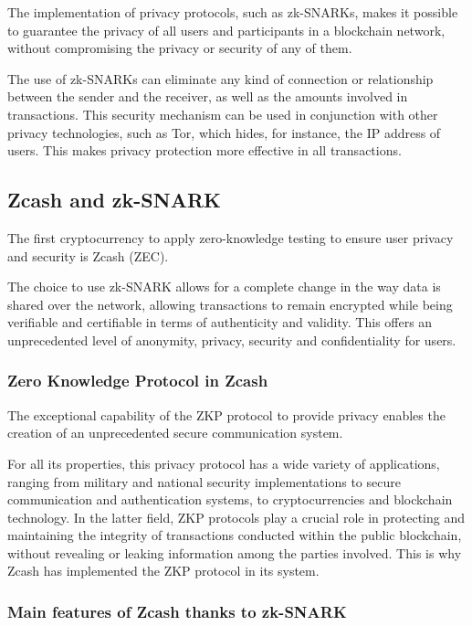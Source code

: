 \noindent The implementation of privacy protocols, such as zk-SNARKs, makes it possible to guarantee the privacy of all users and participants in a blockchain network, without compromising the privacy or security of any of them. 

\noindent The use of zk-SNARKs can eliminate any kind of connection or relationship between the sender and the receiver, as well as the amounts involved in transactions. This security mechanism can be used in conjunction with other privacy technologies, such as Tor, which hides, for instance, the IP address of users. This makes privacy protection more effective in all transactions.

\subsection{Zcash and zk-SNARK}

\noindent The first cryptocurrency to apply zero-knowledge testing to ensure user privacy and security is Zcash (ZEC).

\noindent The choice to use zk-SNARK allows for a complete change in the way data is shared over the network, allowing transactions to remain encrypted while being verifiable and certifiable in terms of authenticity and validity. This offers an unprecedented level of anonymity, privacy, security and confidentiality for users.

\subsubsection{Zero Knowledge Protocol in Zcash}

The exceptional capability of the ZKP protocol to provide privacy enables the creation of an unprecedented secure communication system.

\noindent For all its properties, this privacy protocol has a wide variety of applications, ranging from military and national security implementations to secure communication and authentication systems, to cryptocurrencies and blockchain technology. In the latter field, ZKP protocols play a crucial role in protecting and maintaining the integrity of transactions conducted within the public blockchain, without revealing or leaking information among the parties involved. This is why Zcash has implemented the ZKP protocol in its system.

\subsubsection{Main features of Zcash thanks to zk-SNARK}

